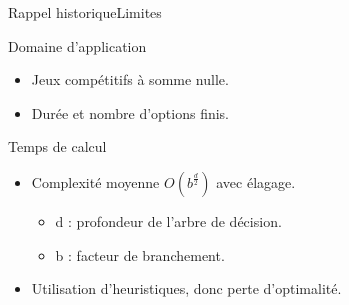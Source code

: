 
\begin{frame}{Rappel historique}{Limites}

\begin{block}{Domaine d'application}
\begin{itemize}
\item Jeux compétitifs à somme nulle.
\item Durée et nombre d'options finis.
\end{itemize}
\end{block}

\pause

\begin{block}{Temps de calcul}
\begin{itemize}
\item Complexité moyenne $O(b^{\frac{d}{2}})$ avec élagage.
	\begin{itemize}
	\item d : profondeur de l'arbre de décision.
	\item b : facteur de branchement.
	\end{itemize}
\item Utilisation d'heuristiques, donc perte d'optimalité.
\end{itemize}
\end{block}

\end{frame}